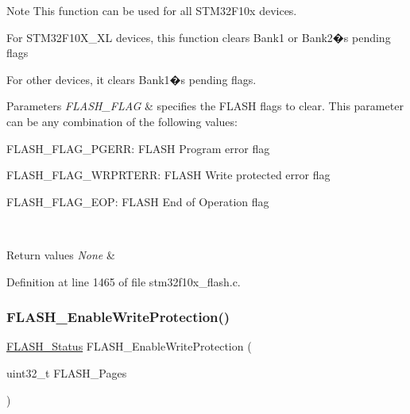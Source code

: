 \begin{DoxyNote}{Note}
This function can be used for all S\+T\+M32\+F10x devices.
\begin{DoxyItemize}
\item For S\+T\+M32\+F10\+X\+\_\+\+XL devices, this function clears Bank1 or Bank2�s pending flags
\item For other devices, it clears Bank1�s pending flags. 
\end{DoxyItemize}
\end{DoxyNote}

\begin{DoxyParams}{Parameters}
{\em F\+L\+A\+S\+H\+\_\+\+F\+L\+AG} & specifies the F\+L\+A\+SH flags to clear. This parameter can be any combination of the following values\+: \begin{DoxyItemize}
\item F\+L\+A\+S\+H\+\_\+\+F\+L\+A\+G\+\_\+\+P\+G\+E\+RR\+: F\+L\+A\+SH Program error flag \item F\+L\+A\+S\+H\+\_\+\+F\+L\+A\+G\+\_\+\+W\+R\+P\+R\+T\+E\+RR\+: F\+L\+A\+SH Write protected error flag \item F\+L\+A\+S\+H\+\_\+\+F\+L\+A\+G\+\_\+\+E\+OP\+: F\+L\+A\+SH End of Operation flag \end{DoxyItemize}
\\
\hline
\end{DoxyParams}

\begin{DoxyRetVals}{Return values}
{\em None} & \\
\hline
\end{DoxyRetVals}


Definition at line 1465 of file stm32f10x\+\_\+flash.\+c.

\mbox{\label{group___f_l_a_s_h___private___functions_gabad10c15e2d1ff1cb9e1083d08a9e763}} 
\subsubsection{\texorpdfstring{F\+L\+A\+S\+H\+\_\+\+Enable\+Write\+Protection()}{FLASH\_EnableWriteProtection()}}
{\footnotesize\ttfamily \hyperlink{group___f_l_a_s_h___exported___types_gadc63a6f3404ff1f71229a66915e9cdc0}{F\+L\+A\+S\+H\+\_\+\+Status} F\+L\+A\+S\+H\+\_\+\+Enable\+Write\+Protection (\begin{DoxyParamCaption}\item[{uint32\+\_\+t}]{F\+L\+A\+S\+H\+\_\+\+Pages }\end{DoxyParamCaption})}



